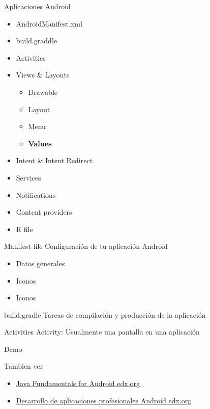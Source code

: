 \documentclass{beamer}
\begin{document}
\begin{frame}{Aplicaciones Android}
    \begin{itemize}
        \item AndroidManifest.xml
         \item build.graddle
        \item Activities
        \item Views \& Layouts
                \begin{itemize}
            \item Drawable
            \item Layout
            \item Menu
            \item \textbf{Values}
        \end{itemize}
        \item Intent \& Intent Redirect
        \item Services
        \item Notifications
        \item Content providers
        \item R file
    \end{itemize}
\end{frame}


\begin{frame}{Manifest file}
    Configuración de tu aplicación Android
    \begin{itemize}
        \item Datos generales
        \item Iconos
        \item Iconos
    \end{itemize}
\end{frame}

\begin{frame}{build.gradle}
    Tareas de compilación y producción de la aplicación
    
\end{frame}

\begin{frame}{Activities}
    \large
    Activity: Usualmente una pantalla en una aplicación
\end{frame}


\begin{frame}
    \huge
    Demo
\end{frame}


\begin{frame}{Tambien ver}
    \begin{itemize}
        \item \href{https://www.edx.org/course/java-fundamentals-android-development-galileox-caad001x}{Java Fundamentals for Android edx.org}
        \item \href{https://www.edx.org/course/java-fundamentals-android-development-galileox-caad001x}{Desarrollo de aplicaciones profesionales Android edx.org}
    \end{itemize}
\end{frame}
\end{document}
